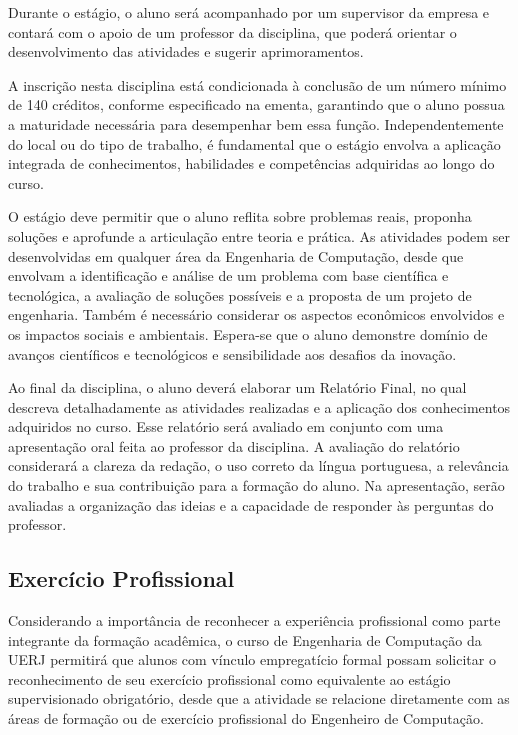 Durante o estágio, o aluno será acompanhado por um supervisor da empresa e contará com o apoio de um professor da disciplina, que poderá orientar o desenvolvimento das atividades e sugerir aprimoramentos.

A inscrição nesta disciplina está condicionada à conclusão de um número mínimo de 140 créditos, conforme especificado na ementa, garantindo que o aluno possua a maturidade necessária para desempenhar bem essa função. Independentemente do local ou do tipo de trabalho, é fundamental que o estágio envolva a aplicação integrada de conhecimentos, habilidades e competências adquiridas ao longo do curso.

O estágio deve permitir que o aluno reflita sobre problemas reais, proponha soluções e aprofunde a articulação entre teoria e prática. As atividades podem ser desenvolvidas em qualquer área da Engenharia de Computação, desde que envolvam a identificação e análise de um problema com base científica e tecnológica, a avaliação de soluções possíveis e a proposta de um projeto de engenharia. Também é necessário considerar os aspectos econômicos envolvidos e os impactos sociais e ambientais. Espera-se que o aluno demonstre domínio de avanços científicos e tecnológicos e sensibilidade aos desafios da inovação.

Ao final da disciplina, o aluno deverá elaborar um Relatório Final, no qual descreva detalhadamente as atividades realizadas e a aplicação dos conhecimentos adquiridos no curso. Esse relatório será avaliado em conjunto com uma apresentação oral feita ao professor da disciplina. A avaliação do relatório considerará a clareza da redação, o uso correto da língua portuguesa, a relevância do trabalho e sua contribuição para a formação do aluno. Na apresentação, serão avaliadas a organização das ideias e a capacidade de responder às perguntas do professor.

\subsection{Exercício Profissional}
Considerando a importância de reconhecer a experiência profissional como parte integrante da formação acadêmica, o curso de Engenharia de Computação da UERJ permitirá que alunos com vínculo empregatício formal possam solicitar o reconhecimento de seu exercício profissional como equivalente ao estágio supervisionado obrigatório, desde que a atividade se relacione diretamente com as áreas de formação ou de exercício profissional do Engenheiro de Computação.

